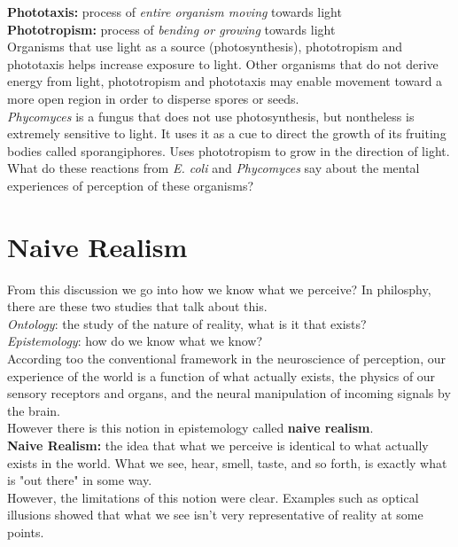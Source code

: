 \documentclass{article}
\begin{document}
\noindent \textbf{Phototaxis:} process of \textit{entire organism moving} towards light\\
\textbf{Phototropism:} process of \textit{bending or growing} towards light \\

\noindent Organisms that use light as a source (photosynthesis), phototropism and phototaxis helps increase exposure to light. Other organisms that do not derive energy from light, phototropism and phototaxis may enable movement toward a more open region in order to disperse spores or seeds. \\

\noindent \textit{Phycomyces} is a fungus that does not use photosynthesis, but nontheless is extremely sensitive to light. It uses it as a cue to direct the growth of its fruiting bodies called sporangiphores. Uses phototropism to grow in the direction of light. \\

\noindent What do these reactions from \textit{E. coli} and \textit{Phycomyces} say about the mental experiences of perception of these organisms? \\

\section{Naive Realism}
From this discussion we go into how we know what we perceive? In philosphy, there are these two studies that talk about this. \\

\noindent \textit{Ontology}: the study of the nature of reality, what is it that exists? \\
\noindent \textit{Epistemology}: how do we know what we know? \\

According too the conventional framework in the neuroscience of perception, our experience of the world is a function of what actually exists, the physics of our sensory receptors and organs, and the neural manipulation of incoming signals by the brain. \\

However there is this notion in epistemology called \textbf{naive realism}. \\

\noindent \textbf{Naive Realism:} the idea that what we perceive is identical to what actually exists in the world. What we see, hear, smell, taste, and so forth, is exactly what is "out there" in some way. \\
However, the limitations of this notion were clear. Examples such as optical illusions showed that what we see isn't very representative of reality at some points. \\
\end{document}
